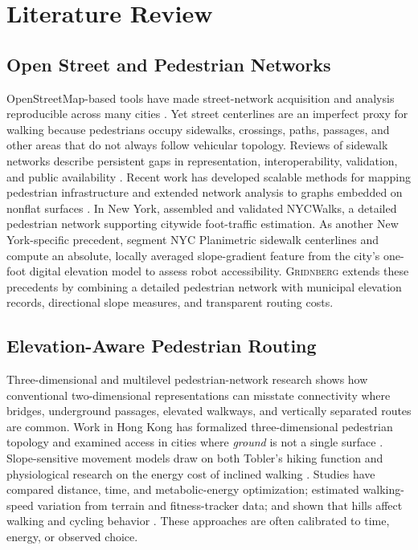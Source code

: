 \documentclass[twocolumn,10pt]{article}
\newcommand{\dataset}{\textsc{Gridnberg}\xspace}
\begin{document}
\section{Literature Review}

\subsection{Open Street and Pedestrian Networks}

OpenStreetMap-based tools have made street-network acquisition and analysis reproducible across many cities \citep{boeing2017osmnx,boeing2022street}. Yet street centerlines are an imperfect proxy for walking because pedestrians occupy sidewalks, crossings, paths, passages, and other areas that do not always follow vehicular topology. Reviews of sidewalk networks describe persistent gaps in representation, interoperability, validation, and public availability \citep{rhoads2023sidewalk}. Recent work has developed scalable methods for mapping pedestrian infrastructure \citep{hosseini2023mapping} and extended network analysis to graphs embedded on nonflat surfaces \citep{barthelemy2025surfacic}. In New York, \citet{sevtsuk2026spatial} assembled and validated NYCWalks, a detailed pedestrian network supporting citywide foot-traffic estimation. As another New York-specific precedent, \citet{franchi2025robotability} segment NYC Planimetric sidewalk centerlines and compute an absolute, locally averaged slope-gradient feature from the city's one-foot digital elevation model to assess robot accessibility. \dataset extends these precedents by combining a detailed pedestrian network with municipal elevation records, directional slope measures, and transparent routing costs.

\subsection{Elevation-Aware Pedestrian Routing}

Three-dimensional and multilevel pedestrian-network research shows how conventional two-dimensional representations can misstate connectivity where bridges, underground passages, elevated walkways, and vertically separated routes are common. Work in Hong Kong has formalized three-dimensional pedestrian topology and examined access in cities where \textit{ground} is not a single surface \citep{sun2021connecting,zhang2022walking}. Slope-sensitive movement models draw on both Tobler's hiking function and physiological research on the energy cost of inclined walking \citep{tobler1993three,minetti2002energy,goodchild2020beyond,irmischer2018measuring}. Studies have compared distance, time, and metabolic-energy optimization; estimated walking-speed variation from terrain and fitness-tracker data; and shown that hills affect walking and cycling behavior \citep{paez2020comparing,campbell2019crowdsourced,campbell2022predicting,broach2012cycling}. These approaches are often calibrated to time, energy, or observed choice.
\end{document}
